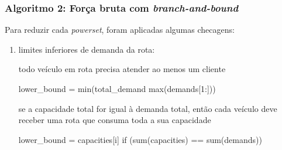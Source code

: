\documentclass{beamer}
\begin{document}
\begin{frame}[fragile] %
    \frametitle{Algoritmo 2: Força bruta com \emph{branch-and-bound}}

    Para reduzir cada \emph{powerset}, foram aplicadas algumas checagens:

    \medskip
    \begin{enumerate}
        \item limites inferiores de demanda da rota:
    \begin{block}{todo veículo em rota precisa atender ao menos um cliente}
    \begin{python}
    lower_bound = min(total_demand %
                      max(demands[1:]))
    \end{python}
    \end{block}

    \begin{block}{se a capacidade total for igual à demanda total, então cada veículo deve receber uma rota que consuma toda a sua capacidade}
    \begin{python}
    lower_bound = capacities[i] if (sum(capacities) ==
                                    sum(demands))
    \end{python}
    \end{block}
        
    \end{enumerate}


\end{frame}



        
\end{document}
